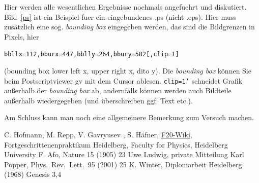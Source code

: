 \documentclass[12pt, a4paper]{article}
\begin{document}
Hier werden alle wesentlichen Ergebnisse nochmals angefuehrt und diskutiert.
Bild~\ref{ps} 
ist ein Beispiel fuer ein eingebundenes .ps (nicht .eps).
Hier muss zus\"atzlich eine sog. {\em bounding box} eingegeben werden, das 
sind die Bildgrenzen in Pixels, hier\\
\centerline{\tt bbllx=112,bburx=447,bblly=264,bbury=582[,clip=1]}
(bounding box lower left x, upper right x, dito y). Die {\it bounding box} 
k\"onnen Sie beim Postscriptviewer gv mit dem Cursor ablesen. {\tt clip=1'}
schneidet Grafik au\ss erhalb der {\it bounding box} ab, andernfalls 
k\"onnen werden auch Bildteile au\ss erhalb wiedergegeben (und \"uberschreiben
ggf. Text etc.).

Am Schluss kann man noch eine allgemeinere Bemerkung zum Versuch machen.


\newpage 


\begin{thebibliography}{00}   %
 C. Hofmann, M. Repp, V. Gavryusev , S. H\"afner, \href{https://www.physi.uni-heidelberg.de/Forschung/QD/f20wikinew/index.php/Main_Page}{F20-Wiki}, Fortgeschrittenenpraktikum Heidelberg, Faculty for Physics, Heidelberg University
 F. Afo, Nature 15 (1905) 23
 Uwe Ludwig, private Mitteilung
 Karl Popper, Phys.~Rev.~Lett.~95 (2001) 25
 K. Winter, Diplomarbeit Heidelberg (1968)
 Genesis 3,4

\end{thebibliography}
\end{document}
